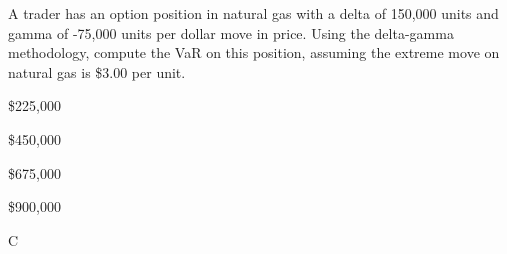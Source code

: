 \documentclass{article}
\newcounter{question} %
\begin{document}
\begin{question}
    A trader has an option position in natural gas with a delta of 150,000 units and gamma of -75,000 units per dollar move in price. Using the delta-gamma methodology, compute the VaR on this position, assuming the extreme move on natural gas is \$3.00 per unit.
\end{question}

\begin{choices}
    \item \$225,000
    \item \$450,000
    \item \$675,000
    \item \$900,000
\end{choices}

\begin{correctanswer}
    C
\end{correctanswer}
\end{document}
